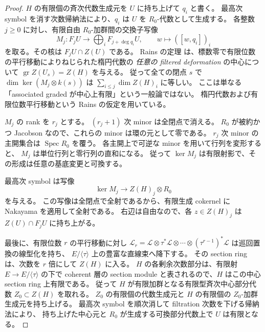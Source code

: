 \begin{proof}
$H$ の有限個の斉次代数生成元を $U$ に持ち上げて $q_i$ と書く。
最高次 symbol を消す次数帰納法により、$q_i$ は $U$ を $R_0$-代数として生成する。
各整数 $j\geq 0$ に対し、有限自由 $R_0$-加群間の交換子写像
\[
 M_j:F_jU\longrightarrow\bigoplus_i F_{j+\deg q_i}U,
 \qquad w\longmapsto ([w,q_i])_i
\]
を取る。その核は $F_jU\cap Z(U)$ である。
Rains の定理 \cite[Theorem 2.13]{Rains}
は、標数零で有限位数の平行移動によりねじられた楕円代数の
\emph{任意の filtered deformation} の中心について
$\operatorname{gr}Z(U_s)=Z(H)$ を与える。
従って全ての閉点 $s$ で $\dim\ker(M_j\otimes k(s))$
は $\sum_{i\leq j}\dim Z(H)_i$ に等しい。
ここは単なる「associated graded が中心上有限」という一般論ではない。
楕円代数および有限位数平行移動という Rains の仮定を用いている。

$M_j$ の rank を $r_j$ とする。
$(r_j+1)$ 次 minor は全閉点で消える。
$R_0$ が被約かつ Jacobson なので、これらの minor は環の元として零である。
$r_j$ 次 minor の主開集合は $\operatorname{Spec}R_0$ を覆う。
各主開上で可逆な minor を用いて行列を変形すると、
$M_j$ は単位行列と零行列の直和になる。
従って $\ker M_j$ は有限射影で、その形成は任意の基底変更と可換する。

最高次 symbol は写像
\[
 \ker M_j\longrightarrow Z(H)_j\otimes R_0
\]
を与える。
この写像は全閉点で全射であるから、有限生成 cokernel に Nakayama を適用して全射である。
右辺は自由なので、各 $z\in Z(H)_j$ は $Z(U)\cap F_jU$ に持ち上がる。

最後に、有限位数 $r$ の平行移動に対し
$\mathcal L_r=\mathcal L\otimes\tau^*\mathcal L\otimes\cdots
\otimes(\tau^{r-1})^*\mathcal L$ は巡回置換の線型化を持ち、
$E/\langle\tau\rangle$ 上の豊富な直線束へ降下する。
その section ring は、次数を $r$ 倍にして $Z(H)$ に入る。
$H$ の各剰余次数部分は、有限射 $E\to E/\langle\tau\rangle$ の下で
coherent 層の section module と表されるので、$H$ はこの中心 section ring 上有限である。
従って $H$ が有限加群となる有限型斉次中心部分代数 $Z_0\subset Z(H)$ を取れる。
$Z_0$ の有限個の代数生成元と $H$ の有限個の $Z_0$-加群生成元を持ち上げる。
最高次 symbol を順次消して filtration 次数を下げる帰納法により、
持ち上げた中心元と $R_0$ が生成する可換部分代数上で $U$ は有限となる。
\end{proof}


